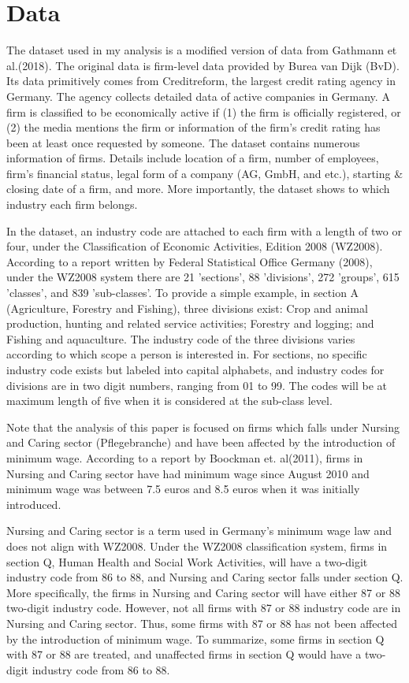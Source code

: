 \documentclass[11pt,a4paper,oneside]{article}
\begin{document}
\section{Data}
The dataset used in my analysis is a modified version of data from Gathmann et al.(2018).\cite{Gathmann2018} The original data is firm-level data provided by Burea van Dijk (BvD). Its data primitively comes from Creditreform, the largest credit rating agency in Germany. The agency collects detailed data of active companies in Germany. A firm is classified to be economically active if (1) the firm is officially registered, or (2) the media mentions the firm or information of the firm's credit rating has been at least once requested by someone. The dataset contains numerous information of firms. Details include location of a firm, number of employees, firm's financial status, legal form of a company (AG, GmbH, and etc.), starting \& closing date of a firm, and more. More importantly, the dataset shows to which industry each firm belongs. 
\par
In the dataset, an industry code are attached to each firm with a length of two or four, under the Classification of Economic Activities, Edition 2008 (WZ2008). According to a report written by Federal Statistical Office Germany (2008)\cite{BundesamtClassification}, under the WZ2008 system there are 21 'sections', 88 'divisions', 272 'groups', 615 'classes', and 839 'sub-classes'. To provide a simple example, in section A (Agriculture, Forestry and Fishing), three divisions exist: Crop and animal production, hunting and related service activities; Forestry and logging; and Fishing and aquaculture. The industry code of the three divisions varies according to which scope a person is interested in. For sections, no specific industry code exists but labeled into capital alphabets, and industry codes for divisions are in two digit numbers, ranging from 01 to 99. The codes will be at maximum length of five when it is considered at the sub-class level. 
\par
Note that the analysis of this paper is focused on firms which falls under Nursing and Caring sector (Pflegebranche) and have been affected by the introduction of minimum wage. According to a report by Boockman et. al(2011)\cite{boockmann2011evaluation}, firms in Nursing and Caring sector have had minimum wage since August 2010 and minimum wage was between 7.5 euros and 8.5 euros when it was initially introduced. 
\par
Nursing and Caring sector is a term used in Germany's minimum wage law and does not align with WZ2008. Under the WZ2008 classification system, firms in section Q, Human Health and Social Work Activities, will have a two-digit industry code from 86 to 88, and Nursing and Caring sector falls under section Q. More specifically, the firms in Nursing and Caring sector will have either 87 or 88 two-digit industry code. However, not all firms with 87 or 88 industry code are in Nursing and Caring sector. Thus, some firms with 87 or 88 has not been affected by the introduction of minimum wage. To summarize, some firms in section Q with 87 or 88 are treated, and unaffected firms in section Q would have a two-digit industry code from 86 to 88.
\end{document}
